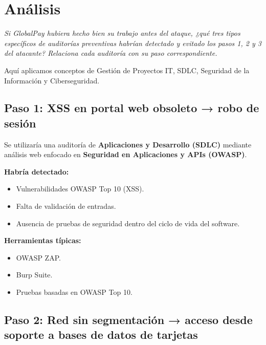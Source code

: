 \documentclass[11pt,a4paper]{article}
\begin{document}

\section{Análisis}

\textit{Si GlobalPay hubiera hecho bien su trabajo antes del ataque, ¿qué tres tipos específicos de auditorías preventivas habrían detectado y evitado los pasos 1, 2 y 3 del atacante? Relaciona cada auditoría con su paso correspondiente.}

\vspace{0.5em}

Aquí aplicamos conceptos de Gestión de Proyectos IT, SDLC, Seguridad de la Información y Ciberseguridad.


\subsection{Paso 1: XSS en portal web obsoleto → robo de sesión}

Se utilizaría una auditoría de \textbf{Aplicaciones y Desarrollo (SDLC)} mediante análisis web enfocado en \textbf{Seguridad en Aplicaciones y APIs (OWASP)}.

\textbf{Habría detectado:}

\begin{itemize}
    \item Vulnerabilidades OWASP Top 10 (XSS).
    \item Falta de validación de entradas.
    \item Ausencia de pruebas de seguridad dentro del ciclo de vida del software.
\end{itemize}

\textbf{Herramientas típicas:}

\begin{itemize}
    \item OWASP ZAP.
    \item Burp Suite.
    \item Pruebas basadas en OWASP Top 10.
\end{itemize}


\subsection{Paso 2: Red sin segmentación → acceso desde soporte a bases de datos de tarjetas}
\end{document}
